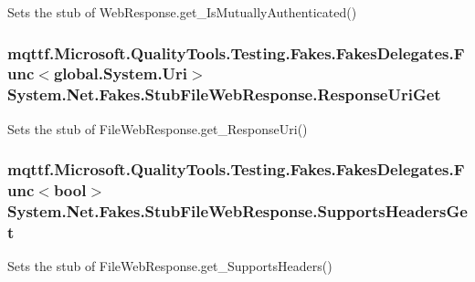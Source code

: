 Sets the stub of Web\-Response.\-get\-\_\-\-Is\-Mutually\-Authenticated()

\hypertarget{class_system_1_1_net_1_1_fakes_1_1_stub_file_web_response_ab6b57438f07e3b478e294f1c105b4cb7}{
\subsubsection[{Response\-Uri\-Get}]{\setlength{\rightskip}{0pt plus 5cm}mqttf.\-Microsoft.\-Quality\-Tools.\-Testing.\-Fakes.\-Fakes\-Delegates.\-Func$<$global.\-System.\-Uri$>$ System.\-Net.\-Fakes.\-Stub\-File\-Web\-Response.\-Response\-Uri\-Get}}\label{class_system_1_1_net_1_1_fakes_1_1_stub_file_web_response_ab6b57438f07e3b478e294f1c105b4cb7}


Sets the stub of File\-Web\-Response.\-get\-\_\-\-Response\-Uri()

\hypertarget{class_system_1_1_net_1_1_fakes_1_1_stub_file_web_response_a5d319bf6a8c6808b2e3b1f0999168a7d}{
\subsubsection[{Supports\-Headers\-Get}]{\setlength{\rightskip}{0pt plus 5cm}mqttf.\-Microsoft.\-Quality\-Tools.\-Testing.\-Fakes.\-Fakes\-Delegates.\-Func$<$bool$>$ System.\-Net.\-Fakes.\-Stub\-File\-Web\-Response.\-Supports\-Headers\-Get}}\label{class_system_1_1_net_1_1_fakes_1_1_stub_file_web_response_a5d319bf6a8c6808b2e3b1f0999168a7d}


Sets the stub of File\-Web\-Response.\-get\-\_\-\-Supports\-Headers()



